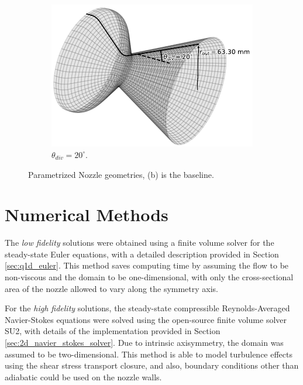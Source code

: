 \begin{figure}[t]
\begin{subfigure}{0.3\textwidth}
        \includegraphics[width=\linewidth]{Figuras/geometry_figures/nozzle_20.pdf}  
        \caption{$\theta_{div}=20^{\circ}$.\label{fig:nozzle_20}}
    \end{subfigure}
    \caption{Parametrized Nozzle geometries, (b) is the baseline.}

\end{figure}

\section{Numerical Methods}

The \textit{low fidelity} solutions  were obtained using a finite volume solver for the steady-state Euler equations, with a detailed description provided in Section \ref{sec:q1d_euler}. This method saves computing time by assuming the flow to be non-viscous and the domain to be one-dimensional, with only the cross-sectional area of the nozzle allowed to vary along the symmetry axis.

For the \textit{high fidelity} solutions, the steady-state compressible Reynolds-Averaged Navier-Stokes equations were solved using the open-source finite volume solver SU2, with details of the implementation provided in Section \ref{sec:2d_navier_stokes_solver}. Due to intrinsic axisymmetry, the domain was assumed to be two-dimensional. This method is able to model turbulence effects using the shear stress transport closure, and also, boundary conditions other than adiabatic could be used on the nozzle walls.

